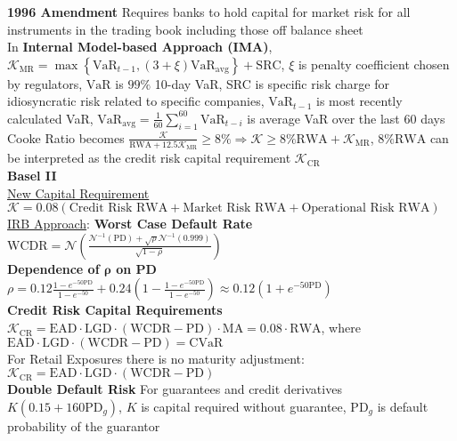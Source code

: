 \documentclass[12pt,landscape, a4paper]{article}
\theoremstyle{remark}
\newcommand{\VaR}{\mathrm{VaR}}
\newcommand{\PD}{\mathrm{PD}}
\newcommand{\EAD}{\mathrm{EAD}}
\newcommand{\LGD}{\mathrm{LGD}}
\newcommand{\N}{\mathcal{N}}
\begin{document}
\begin{multicols*}{3}
\textbf{1996 Amendment} Requires banks to hold capital for market risk for all instruments in the trading book including those off balance sheet\\

In \textbf{Internal Model-based Approach (IMA)}, $\mathcal{K}_{\mathrm{MR}} = \max \left\{\VaR_{t-1} , (3+\xi) \VaR_{\mathrm{avg}}\right\} +\mathrm{SRC} $, $\xi$ is penalty coefficient chosen by regulators, $\VaR$ is $99\%$ 10-day VaR, SRC is specific risk charge for idiosyncratic risk related to specific companies, $\VaR_{t-1}$ is most recently calculated VaR, $\VaR_{\mathrm{avg}} = \frac{1}{60} \sum^{60}_{i=1} \VaR_{t-i}  $ is average VaR over the last $60$ days\\

Cooke Ratio becomes $\frac{\mathcal{K}}{\mathrm{RWA}+12.5 \mathcal{K}_{\mathrm{MR}} } \geq 8\% \Rightarrow \mathcal{K} \geq 8\% \mathrm{RWA} + \mathcal{K}_{\mathrm{MR}} $, $8\% \mathrm{RWA}$ can be interpreted as the credit risk capital requirement $\mathcal{K}_{\mathrm{CR}}$\\

\textbf{Basel II} \\
\underline{New Capital Requirement} $\mathcal{K} = 0.08 (\text{Credit Risk RWA} + \text{Market Risk RWA} + \text{Operational Risk RWA})$\\

\underline{IRB Approach}: 
\textbf{Worst Case Default Rate} $\mathrm{WCDR} =\N \left( \frac{\N^{-1} (\PD) + \sqrt{\rho} \N^{-1} (0.999) }{\sqrt{1-\rho}} \right) $\\

\textbf{Dependence of $\mathbf{\rho} $ on PD} $\rho = 0.12 \frac{1 - e^{-50\PD}}{1-e^{-50}} + 0.24\left(1- \frac{1 - e^{-50\PD}}{1-e^{-50}} \right) \approx 0.12(1+ e^{-50\PD}) $\\

\textbf{Credit Risk Capital Requirements} $\mathcal{K}_{\mathrm{CR}} = \EAD \cdot\LGD \cdot(\mathrm{WCDR} -\PD ) \cdot \mathrm{MA} =0.08 \cdot \mathrm{RWA}  $, where $\EAD \cdot\LGD \cdot(\mathrm{WCDR} -\PD ) = \mathrm{CVaR}$\\

For Retail Exposures there is no maturity adjustment:$\mathcal{K}_{\mathrm{CR}} = \EAD \cdot\LGD \cdot(\mathrm{WCDR} -\PD )$\\

\textbf{Double Default Risk} For guarantees and credit derivatives $K (0.15 + 160 \PD_g)$, $K$ is capital required without guarantee, $\PD_g$ is default probability of the guarantor\\


\end{multicols*}
\end{document}

